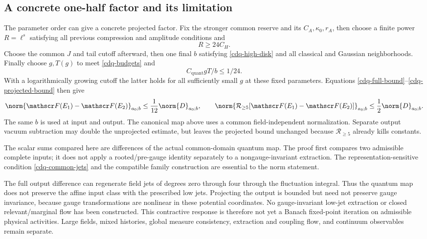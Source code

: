 \subsection{A concrete one-half factor and its limitation}
\label{cdq-scope-section}

The parameter order can give a concrete projected factor.
Fix the stronger common reserve and its $C_A,\kappa_0,r_A$,
then choose a finite power $R=\ell^s$ satisfying all
previous compression and amplitude conditions and
\begin{equation}
 R\ge24C_H.
 \label{cdq-R-choice}
\end{equation}
Choose the common $J$ and tail cutoff afterward, then
one final $b$ satisfying \eqref{cdq-high-disk} and all
classical and Gaussian neighborhoods. Finally choose
$g,T(g)$ to meet \eqref{cdq-budgets} and
\begin{equation}
 C_{\mathrm{quant}}gT/b\le1/24.
 \label{cdq-g-choice}
\end{equation}
With a logarithmically growing cutoff the latter holds
for all sufficiently small $g$ at these fixed parameters.
Equations \eqref{cdq-full-bound}--\eqref{cdq-projected-bound}
then give
\begin{equation}
 \norm{\mathscr F(E_1)-\mathscr F(E_2)}_{a_0;b}
       \le\frac1{12}\norm{D}_{a_0;b},\qquad
 \norm{\mathcal R_{\ge5}
       [\mathscr F(E_1)-\mathscr F(E_2)]}_{a_0;b}
       \le\frac12\norm{D}_{a_0;b}.
 \label{cdq-half-contraction}
\end{equation}
The same $b$ is used at input and output. The canonical
map above uses a common field-independent normalization.
Separate output vacuum subtraction may double the
unprojected estimate, but leaves the projected bound
unchanged because $\mathcal R_{\ge5}$ already kills
constants.

The scalar sums compared here are differences of the
actual common-domain quantum map. The proof first
compares two admissible complete inputs; it does not
apply a rooted/pre-gauge identity separately to a
nongauge-invariant extraction. The representation-sensitive
condition \eqref{cdq-common-jets} and the compatible
family construction are essential to the norm statement.

The full output difference can regenerate field jets
of degrees zero through four through the fluctuation
integral. Thus the quantum map does not preserve the
affine input class with the prescribed low jets.
Projecting the output is bounded but need not preserve
gauge invariance, because gauge transformations are
nonlinear in these potential coordinates. No
gauge-invariant low-jet extraction or closed
relevant/marginal flow has been constructed.
This contractive response is therefore not yet a
Banach fixed-point iteration on admissible physical
activities. Large fields, mixed histories, global
measure consistency, extraction and coupling flow,
and continuum observables remain separate.
